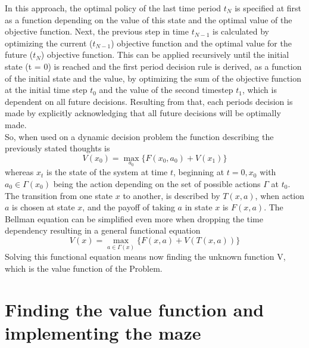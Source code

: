 \documentclass[conference]{IEEEtran}
\begin{document}
In this approach, the optimal policy of the last time period $t_N$ is specified at first as a function depending on the value of this state and the optimal value of the objective function.
Next, the previous step in time $t_{N-1}$ is calculated by optimizing the current ($t_{N-1}$) objective function and the optimal value for the future ($t_{N}$) objective function. This can be applied recursively until the initial state (t = 0) is reached and the first period decision rule is derived, as a function of the initial state and the value, by optimizing the sum of the objective function at the initial time step $t_{0}$ and the value of the second timestep $t_{1}$, which is dependent on all future decisions. Resulting from that, each periods decision is made by explicitly acknowledging that all future decisions will be optimally made.\\
So, when used on a dynamic decision problem the function describing the previously stated thoughts is
\begin{equation}
V(x_0) = \max_{a_0} \{F(x_0, a_0) + V(x_1)\}
\end{equation}
whereas $x_t$ is the state of the system at time $t$, beginning at $t = 0, x_0$ with
$a_0 \in \Gamma(x_0)$ being the action depending on the set of possible actions $\Gamma$ at $t_0$.
The transition from one state $x$ to another, is described by $T(x,a)$, when action $a$ is chosen at state $x$, and the payoff of taking $a$ in state $x$ is $F(x,a)$.
The Bellman equation can be simplified even more when dropping the time dependency resulting in a general functional equation
\begin{equation}
V(x) = \max_{a \in \Gamma(x)} \{F(x,a) + V(T(x,a))\}
\end{equation}
Solving this functional equation means now finding the unknown function V, which is the value function of the Problem. \cite{Bellman.2013}
\\

\section{Finding the value function and implementing the maze}
\end{document}
